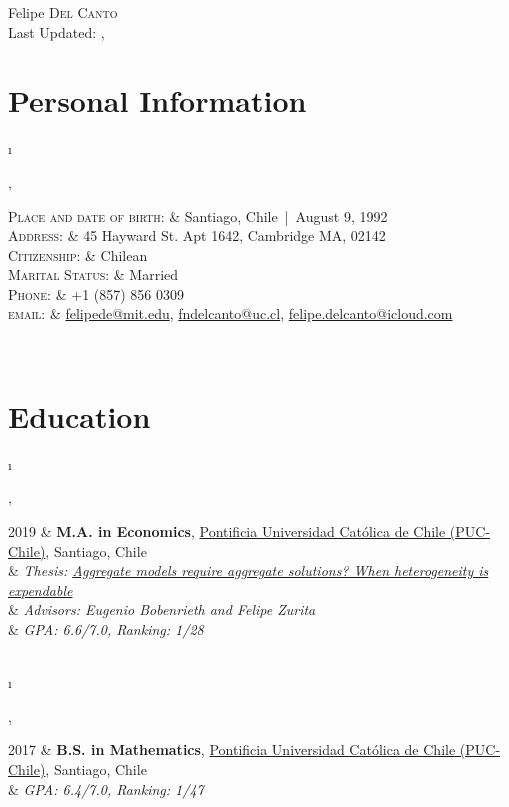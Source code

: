 \documentclass[a4paper, 10pt]{article}
\newcommand{\tablength}{}
\newcommand{\setTabParams}[1]{\renewcommand\tablength{}\forcsvlist{\listadd\tablength}{#1}}
\newcommand{\setCols}[1]{			%
	\ifnum0=\i						%
		\ifdim0cm=#1				%
			\def \firstCol {r}		%
		\else						%
			\def \firstCol {p{#1}}		%
		\fi						%
	\else \ifnum1=\i				%
		\ifdim0cm=#1				%
			\def \secondCol {l}		%
		\else						%
			\def \secondCol{p{#1}}	%
		\fi						%
	\else \ifnum2=\i				%
		\ifnum0=#1				%
			\def \sep {}			%
		\else						%
			\def \sep {|}			%
		\fi						%
	\fi \fi \fi						%
	\advance\i by1					%
}
\newcommand{\tab}[1]{					%
	\newcount\i						%
	\forlistloop{\setCols}{\tablength}		%
	\begin{tabular}{\firstCol \sep \secondCol}	%
		#1							%
	\end{tabular} \\						%
}
\begin{document}
\pagestyle{empty} 

\par{\centering
		{{\Huge Felipe \textsc{Del Canto}}	\\[1.5ex]
		 {\large Last Updated: \monthname, \the\year }
	}\par}

\section{Personal Information}
\setTabParams{0cm,0cm,0}

\tab{
    \textsc{Place and date of birth:}	&	Santiago, Chile\,  |\, August 9, 1992							\\[0.2ex]
    \textsc{Address:}   				&	45 Hayward St. Apt 1642, Cambridge MA, 02142					\\[0.2ex]
    \textsc{Citizenship:}				&	Chilean															\\[0.2ex]
    \textsc{Marital Status:}			&	Married															\\[0.2ex]
    \textsc{Phone:}	   					&	+1 (857) 856 0309												\\[0.2ex]
    \textsc{email:}     				&	\href{mailto:felipede@mit.edu}{felipede@mit.edu}, \href{mailto:fndelcanto@uc.cl}{fndelcanto@uc.cl},
    								\href{mailto:felipe.delcanto@icloud.com}{felipe.delcanto@icloud.com}
}

\section{Education}
\setTabParams{0cm,0cm,0}

\tab{
\textsc{2019}
	&	\textbf{M.A. in Economics}, \href{https://economia.uc.cl/programas-academicos/magister-en-economia/}{Pontificia Universidad Católica de Chile (PUC-Chile)}, Santiago, Chile											\\[0.2ex]
	&	\emph{\quad Thesis: \href{https://economia.uc.cl/wp-content/uploads/2020/01/tesis-DelCanto-2019.pdf}{Aggregate models require aggregate solutions? When heterogeneity is expendable}}				\\[0.2ex]
	&	\emph{\quad Advisors: Eugenio Bobenrieth and Felipe Zurita}	\\[0.2ex]
	&	\emph{\quad GPA: 6.6/7.0, Ranking: 1/28}
}

\tab{
\textsc{2017}
	& 	\textbf{B.S. in Mathematics}, \href{http://www.mat.uc.cl/?lang=en}{Pontificia Universidad Católica de Chile (PUC-Chile)}, Santiago, Chile	\\[0.2ex]
	&	\emph{\quad GPA: 6.4/7.0, Ranking: 1/47}
}
\end{document}
